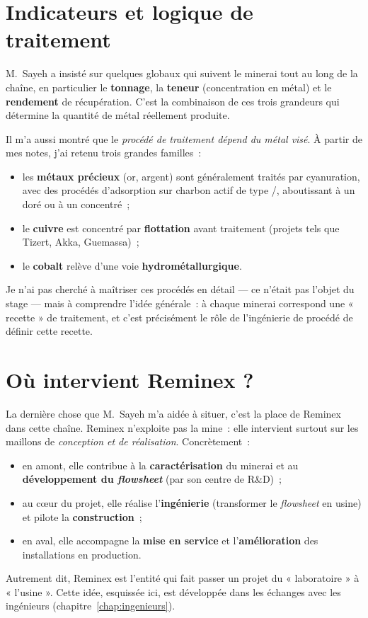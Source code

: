 \section{Indicateurs et logique de traitement}

M.~Sayeh a insisté sur quelques  globaux qui suivent le minerai tout au long de la chaîne, en particulier le \textbf{tonnage}, la \textbf{teneur} (concentration en métal) et le \textbf{rendement} de récupération. C'est la combinaison de ces trois grandeurs qui détermine la quantité de métal réellement produite.

Il m'a aussi montré que le \emph{procédé de traitement dépend du métal visé}. À partir de mes notes, j'ai retenu trois grandes familles~:

\begin{itemize}
\item les \textbf{métaux précieux} (or, argent) sont généralement traités par cyanuration, avec des procédés d'adsorption sur charbon actif de type /, aboutissant à un doré ou à un concentré~;
\item le \textbf{cuivre} est concentré par \textbf{flottation} avant traitement (projets tels que Tizert, Akka, Guemassa)~;
\item le \textbf{cobalt} relève d'une voie \textbf{hydrométallurgique}.
\end{itemize}

Je n'ai pas cherché à maîtriser ces procédés en détail --- ce n'était pas l'objet du stage --- mais à comprendre l'idée générale~: à chaque minerai correspond une « recette » de traitement, et c'est précisément le rôle de l'ingénierie de procédé de définir cette recette.

\section{Où intervient Reminex ?}

La dernière chose que M.~Sayeh m'a aidée à situer, c'est la place de Reminex dans cette chaîne. Reminex n'exploite pas la mine~: elle intervient surtout sur les maillons de \emph{conception et de réalisation}. Concrètement~:

\begin{itemize}
\item en amont, elle contribue à la \textbf{caractérisation} du minerai et au \textbf{développement du \textit{flowsheet}} (par son centre de R\&D)~;
\item au cœur du projet, elle réalise l'\textbf{ingénierie} (transformer le \textit{flowsheet} en usine) et pilote la \textbf{construction}~;
\item en aval, elle accompagne la \textbf{mise en service} et l'\textbf{amélioration} des installations en production.
\end{itemize}

Autrement dit, Reminex est l'entité qui fait passer un projet du « laboratoire » à « l'usine ». Cette idée, esquissée ici, est développée dans les échanges avec les ingénieurs (chapitre~\ref{chap:ingenieurs}).
